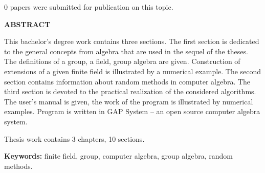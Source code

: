 $0$ papers were submitted for publication on this topic.

\begin{center}
\textbf{ABSTRACT}
\end{center}

This bachelor's degree work contains three sections.
The first section is dedicated to the general concepts from algebra that are used in the sequel of the theses. The definitions of a group, a field, group algebra are given. Construction of extensions of a given finite field is illustrated by a numerical example. The second section contains information about random methods in computer algebra. The third section is devoted to the practical realization of the considered algorithms. The user's manual is given, the work of the program is illustrated by numerical examples. Program is written in GAP System -- an open source computer algebra system. 

Thesis work contains 3 chapters, 10 sections.

{\bf Keywords:} finite field, group, computer algebra, group algebra, random methods.

